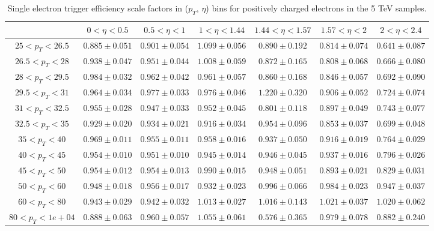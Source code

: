 \begin{table}
\begin{center}
{\begin{tabular}{ccccccc}
\hline
& $0< \eta<0.5$ & $0.5< \eta<1$ & $1< \eta<1.44$ & $1.44< \eta<1.57$ & $1.57< \eta<2$ & $2< \eta<2.4$ \\
\hline \hline
$25<p_{T}<26.5$ & $0.885 \pm 0.051$ & $0.901 \pm 0.054$ & $1.099 \pm 0.056$ & $0.890 \pm 0.192$ & $0.814 \pm 0.074$ & $0.641 \pm 0.087$  \\
$26.5<p_{T}<28$ & $0.938 \pm 0.047$ & $0.951 \pm 0.044$ & $1.008 \pm 0.059$ & $0.872 \pm 0.165$ & $0.808 \pm 0.068$ & $0.666 \pm 0.080$  \\
$28<p_{T}<29.5$ & $0.984 \pm 0.032$ & $0.962 \pm 0.042$ & $0.961 \pm 0.057$ & $0.860 \pm 0.168$ & $0.846 \pm 0.057$ & $0.692 \pm 0.090$  \\
$29.5<p_{T}<31$ & $0.964 \pm 0.034$ & $0.977 \pm 0.033$ & $0.976 \pm 0.046$ & $1.220 \pm 0.320$ & $0.906 \pm 0.052$ & $0.724 \pm 0.074$  \\
$31<p_{T}<32.5$ & $0.955 \pm 0.028$ & $0.947 \pm 0.033$ & $0.952 \pm 0.045$ & $0.801 \pm 0.118$ & $0.897 \pm 0.049$ & $0.743 \pm 0.077$  \\
$32.5<p_{T}<35$ & $0.929 \pm 0.020$ & $0.934 \pm 0.021$ & $0.916 \pm 0.034$ & $0.954 \pm 0.096$ & $0.853 \pm 0.037$ & $0.699 \pm 0.048$  \\
$35<p_{T}<40$ & $0.969 \pm 0.011$ & $0.955 \pm 0.011$ & $0.958 \pm 0.016$ & $0.937 \pm 0.050$ & $0.916 \pm 0.019$ & $0.764 \pm 0.029$  \\
$40<p_{T}<45$ & $0.954 \pm 0.010$ & $0.951 \pm 0.010$ & $0.945 \pm 0.014$ & $0.946 \pm 0.045$ & $0.937 \pm 0.016$ & $0.796 \pm 0.026$  \\
$45<p_{T}<50$ & $0.954 \pm 0.012$ & $0.954 \pm 0.013$ & $0.990 \pm 0.015$ & $0.948 \pm 0.051$ & $0.893 \pm 0.021$ & $0.829 \pm 0.031$  \\
$50<p_{T}<60$ & $0.948 \pm 0.018$ & $0.956 \pm 0.017$ & $0.932 \pm 0.023$ & $0.996 \pm 0.066$ & $0.984 \pm 0.023$ & $0.947 \pm 0.037$  \\
$60<p_{T}<80$ & $0.943 \pm 0.029$ & $0.942 \pm 0.032$ & $1.013 \pm 0.027$ & $1.016 \pm 0.143$ & $1.021 \pm 0.037$ & $1.020 \pm 0.062$  \\
$80<p_{T}<1e+04$ & $0.888 \pm 0.063$ & $0.960 \pm 0.057$ & $1.055 \pm 0.061$ & $0.576 \pm 0.365$ & $0.979 \pm 0.078$ & $0.882 \pm 0.240$  \\
\hline
\end{tabular}}
\end{center}
\caption{Single electron trigger efficiency scale factors in ($p_T$, $\eta$) bins for positively charged electrons in the 5 TeV samples.}
\label{tab:Eff:el:5TeV:HLT:pos}
\end{table}
